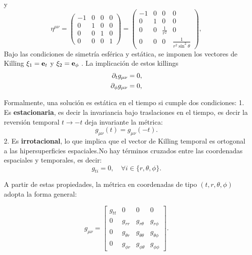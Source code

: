 y
\begin{equation}
    \eta^{\mu \nu}=\left(\begin{array}{cccc}
            -1 & 0 & 0 & 0 \\
            0  & 1 & 0 & 0 \\
            0  & 0 & 1 & 0 \\
            0  & 0 & 0 & 1
        \end{array}\right)=\left(\begin{array}{cccc}
            -1 & 0 & 0               & 0                                \\
            0  & 1 & 0               & 0                                \\
            0  & 0 & \frac{1}{r^{2}} & 0                                \\
            0  & 0 & 0               & \frac{1}{r^{2} \sin ^{2} \theta}
        \end{array}\right),
\end{equation}
Bajo las condiciones de simetría esférica y estática, se imponen los  vectores de Killing $\mathbf{\xi}_1 = \mathbf{e}_t$ y $\mathbf{\xi}_2 = \mathbf{e}_\phi$ .
La implicación de estos killings 
\begin{align}
\partial_{t}{g_{\mu \nu}} = 0 ,\\
\partial_{\phi}{g_{\mu \nu}} = 0 ,\\
\end{align}


Formalmente, una solución es estática en el tiempo si cumple dos condiciones:
1. Es \textbf{estacionaria}, es decir la invariancia bajo traslaciones en el tiempo, es decir la reversión temporal \( t \to -t \) deja invariante la métrica:
          \[ g_{\mu\nu}(t) = g_{\mu\nu}(-t). \]
2. Es \textbf{irrotacional}, lo que implica que el vector de Killing temporal es ortogonal a las hipersuperficies espaciales.No hay términos cruzados entre las coordenadas espaciales y temporales, es decir:
          \[ g_{ti} = 0, \quad \forall i \in \{r, \theta, \phi\}. \]


A partir de estas propiedades, la métrica en coordenadas de tipo \((t, r, \theta, \phi)\) adopta la forma general:

\begin{equation}
    g_{\mu \nu} =
    \begin{bmatrix}
        g_{tt} & 0            & 0                & 0              \\
        0      & g_{rr}       & g_{r\theta}      & g_{r\phi}      \\
        0      & g_{\theta r} & g_{\theta\theta} & g_{\theta\phi} \\
        0      & g_{\phi r}   & g_{\phi\theta}   & g_{\phi\phi}
    \end{bmatrix}.
\end{equation}



